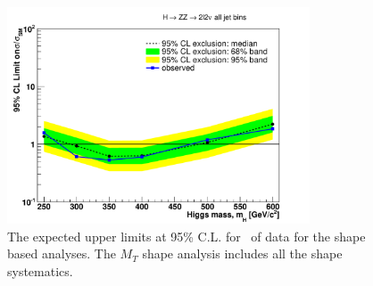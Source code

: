 \begin{figure}[!htbp]
\begin{center}
   \includegraphics[width=0.8\textwidth]{figures/limits_mtshape_5fb.pdf}
   \caption{ The expected upper limits at 95\% C.L. for \intlumi\ of data for the shape based
    analyses. The $M_T$ shape analysis includes all the shape systematics. }
   \label{fig:limits_mtshape_5fb}
\end{center}
\end{figure}
